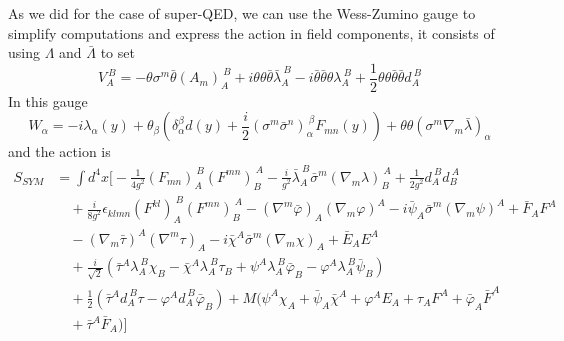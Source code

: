 \documentclass[a4paper,12pt]{article}
\numberwithin{equation}{section}
\numberwithin{exe}{section}
\newcommand{\Fb}{{\bar F}}
\newcommand{\N}{{\nabla}}
\renewcommand{\a}{{\alpha}}
\renewcommand{\b}{{\beta}}
\renewcommand{\d}{{\delta}}
\newcommand{\e}{{\epsilon}}
\renewcommand{\l}{{\lambda}}
\newcommand{\lb}{{\bar\lambda}}
\renewcommand{\L}{{\Lambda}}
\newcommand{\Lb}{{\bar\Lambda}}
\newcommand{\s}{{\sigma}}
\renewcommand{\sb}{{\bar\sigma}}
\renewcommand{\t}{{\theta}}
\newcommand{\tb}{{\bar\theta}}
\newcommand{\vphi}{{\varphi}}
\newcommand{\vphib}{{\bar\varphi}}
\newcommand{\chib}{{\bar\chi}}
\newcommand{\taub}{{\bar\tau}}
\newcommand{\psib}{{\bar\psi}}
\begin{document}
As we did for the case of super-QED, we can use the Wess-Zumino gauge to simplify computations and express the action in field components, it consists of using $\L$ and $\Lb$ to set
	\begin{equation}
	V_A^{\ B} = -\t\s^m\tb (A_m)_A^{\ B} + i\t\t\tb\lb_A^{\ B} - i\tb\tb\t \l_A^{\ B} + \frac12 \t\t\tb\tb d_A^{\ B}
	\end{equation}
In this gauge
	\begin{equation}
	W_\a = -i\l_\a(y) + \t_\b (\d_\a^\b d(y) + \frac{i}{2} (\s^m\sb^n)_\a^{\ \b} F_{mn}(y)) + \t\t (\s^m\N_m\lb)_\a 
	\end{equation}
and the action is
	\begin{align}
	S_{SYM} & = \int d^4 x  \Big[ -\frac{1}{4g^2}(F_{mn})_A^{\ B} (F^{mn})_B^{\ A} - \frac{i}{g^2} \lb_A^{\ B} \sb^m (\N_m\l)_B^{\ A} + \frac{1}{2g^2} d_A^{\ B} d_B^{\ A} \nonumber \\
	 & \quad + \frac{i}{8g^2} \e_{klmn} (F^{kl})_A^{\ B} (F^{mn})_B^{\ A} - (\N^m\vphib)_A(\N_m\vphi)^A -i\psib_A\sb^m(\N_m\psi)^A + \Fb_A F^A \nonumber \\
	& \quad -(\N_m\taub)^A(\N^m\tau)_A -i\chib^A\sb^m(\N_m\chi)_A + \bar E_A E^A \nonumber \\
	& \quad + \frac{i}{\sqrt2}(\taub^A\l_A^{\ B}\chi_B-\chib^A\l_A^{\ B}\tau_B + \psi^A\l_A^{\ B}\vphib_B - \vphi^A\l_A^{\ B}\psib_B) \nonumber \\
	& \quad + \frac12 (\taub^A d_A^{\ B} \tau - \vphi^A d_A^{\ B} \vphib_B) + M (\psi^A\chi_A + \psib_A\chib^A + \vphi^A E_A +\tau_A F^A + \vphib_A \Fb^A \nonumber \\
	& \quad + \taub^A \Fb_A) \Big]
	\end{align}
\end{document}
